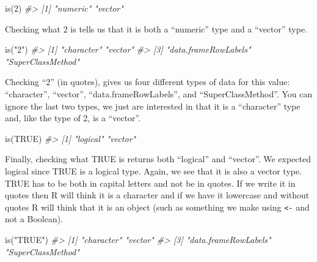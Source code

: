 \documentclass[
]{krantz}
\makeatletter
\newenvironment{Shaded}{\begin{snugshade}}{\end{snugshade}}
\newcommand{\CommentTok}[1]{\textcolor[rgb]{0.37,0.37,0.37}{\textit{#1}}}
\newcommand{\ConstantTok}[1]{\textcolor[rgb]{0,0,0}{#1}}
\newcommand{\DecValTok}[1]{\textcolor[rgb]{0.06,0.06,0.06}{#1}}
\newcommand{\FunctionTok}[1]{\textcolor[rgb]{0,0,0}{#1}}
\newcommand{\NormalTok}[1]{#1}
\newcommand{\StringTok}[1]{\textcolor[rgb]{0.5,0.5,0.5}{#1}}
\newenvironment{kframe}{%
\medskip{}
\setlength{\fboxsep}{.8em}
 \def\at@end@of@kframe{}%
 \ifinner\ifhmode%
  \def\at@end@of@kframe{\end{minipage}}%
  \begin{minipage}{\columnwidth}%
 \fi\fi%
 \def\FrameCommand##1{\hskip\@totalleftmargin \hskip-\fboxsep
 \colorbox{shadecolor}{##1}\hskip-\fboxsep
     \hskip-\linewidth \hskip-\@totalleftmargin \hskip\columnwidth}%
 \MakeFramed {\advance\hsize-\width
   \@totalleftmargin\z@ \linewidth\hsize
   \@setminipage}}%
 {\par\unskip\endMakeFramed%
 \at@end@of@kframe}
\renewenvironment{Shaded}{\begin{kframe}}{\end{kframe}}
\makeatother
\begin{document}
\begin{Shaded}
\begin{Highlighting}[]
\FunctionTok{is}\NormalTok{(}\DecValTok{2}\NormalTok{)}
\CommentTok{\#\textgreater{} [1] "numeric" "vector"}
\end{Highlighting}
\end{Shaded}

Checking what 2 is tells us that it is both a ``numeric''
type and a ``vector'' type.

\begin{Shaded}
\begin{Highlighting}[]
\FunctionTok{is}\NormalTok{(}\StringTok{"2"}\NormalTok{)}
\CommentTok{\#\textgreater{} [1] "character"           "vector"             }
\CommentTok{\#\textgreater{} [3] "data.frameRowLabels" "SuperClassMethod"}
\end{Highlighting}
\end{Shaded}

Checking ``2'' (in quotes), gives us four different types of
data for this value: ``character'', ``vector'',
``data.frameRowLabels'', and ``SuperClassMethod''. You can
ignore the last two types, we just are interested in that it
is a ``character'' type and, like the type of 2, is a
``vector''.

\begin{Shaded}
\begin{Highlighting}[]
\FunctionTok{is}\NormalTok{(}\ConstantTok{TRUE}\NormalTok{)}
\CommentTok{\#\textgreater{} [1] "logical" "vector"}
\end{Highlighting}
\end{Shaded}

Finally, checking what TRUE is returns both ``logical'' and
``vector''. We expected logical since TRUE is a logical
type. Again, we see that it is also a vector type. TRUE has
to be both in capital letters and not be in quotes. If we
write it in quotes then R will think it is a character and
if we have it lowercase and without quotes R will think that
it is an object (such as something we make using
\texttt{\textless{}-} and not a Boolean).

\begin{Shaded}
\begin{Highlighting}[]
\FunctionTok{is}\NormalTok{(}\StringTok{"TRUE"}\NormalTok{)}
\CommentTok{\#\textgreater{} [1] "character"           "vector"             }
\CommentTok{\#\textgreater{} [3] "data.frameRowLabels" "SuperClassMethod"}
\end{Highlighting}
\end{Shaded}
\end{document}

